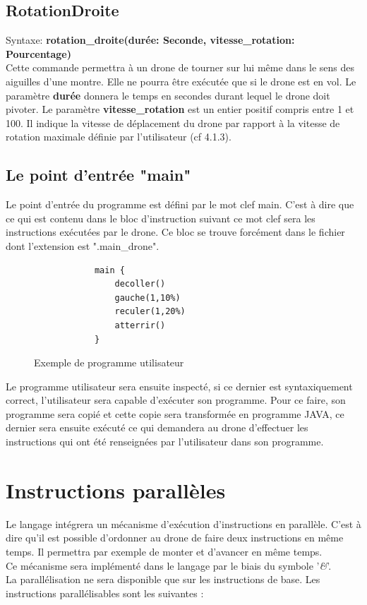 \documentclass[12pt, openany]{report}
\begin{document}
\subsection{RotationDroite}
\quad Syntaxe: \textbf{rotation\_droite(durée: Seconde, vitesse\_rotation: Pourcentage)} \\
Cette commande permettra à un drone de tourner sur lui même dans le sens des aiguilles d'une montre. 
Elle ne pourra être exécutée que si le drone est en vol.
Le paramètre \textbf{durée} donnera le temps en secondes durant lequel le drone doit pivoter.
Le paramètre \textbf{vitesse\_rotation} est un entier positif compris entre 1 et 100. Il indique la vitesse de déplacement du drone par rapport à la vitesse de rotation maximale définie par l'utilisateur (cf 4.1.3). \\

\subsection{Le point d'entrée "main"}
Le point d'entrée du programme est défini par le mot clef main. C'est à dire que ce qui est contenu dans le bloc d'instruction suivant ce mot clef sera les instructions exécutées par le drone. Ce bloc se trouve forcément dans le fichier dont l'extension est ".main\_drone".

    \begin{figure}[h!]
        \begin{center}
            \begin{Verbatim}
            main {
                decoller()
                gauche(1,10%)
                reculer(1,20%)
                atterrir()
            }
            \end{Verbatim}
        \end{center}
        \caption{Exemple de programme utilisateur}
        \label{Exemple de programme utilisateur}
    \end{figure}
Le programme utilisateur sera ensuite inspecté, si ce dernier est syntaxiquement correct, l'utilisateur sera capable d'exécuter son programme. Pour ce faire, son programme sera copié et cette copie sera transformée en programme JAVA, ce dernier sera ensuite exécuté ce qui demandera au drone d'effectuer les instructions qui ont été renseignées par l'utilisateur dans son programme.

\section{Instructions parallèles}
Le langage intégrera un mécanisme d'exécution d'instructions en parallèle. C'est à dire qu'il est possible d'ordonner au drone de faire deux instructions en même temps.
Il permettra par exemple de monter et d'avancer en même temps. \\
Ce mécanisme sera implémenté dans le langage par le biais du symbole '\textit{\&}'. \\
La parallélisation ne sera disponible que sur les instructions de base.
Les instructions parallélisables sont les suivantes :
\end{document}
